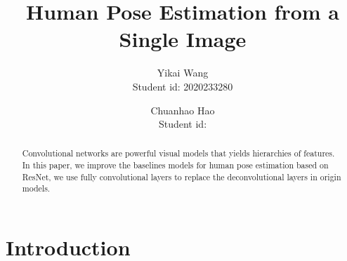 \documentclass[final]{cvpr}
\begin{document}
\title{Human Pose Estimation from a Single Image}

\author{Yikai Wang\\
Student id: 2020233280\\
{}
\and
Chuanhao Hao\\
Student id:\\
{}
}

\maketitle


\begin{abstract}
Convolutional networks are powerful visual models that yields hierarchies of features. In this paper, we improve the baselines models for human pose estimation based on ResNet\cite{he2016deep}, we use fully convolutional layers to replace the deconvolutional layers in origin models.
\end{abstract}

\section{Introduction}
\end{document}

